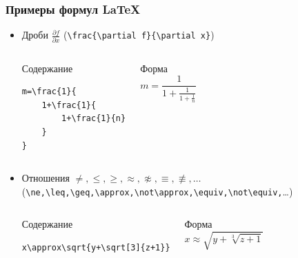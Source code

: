 \begin{frame}[fragile]
\frametitle{Примеры формул \LaTeX}
\begin{itemize}
    
\item Дроби $\frac{\partial f}{\partial x}$ (\verb"\frac{\partial f}{\partial x}")
    \begin{columns}
            \begin{block}{Содержание}
\begin{verbatim}
m=\frac{1}{
    1+\frac{1}{
        1+\frac{1}{n}
    }
}
\end{verbatim}
            \end{block}
        
            \begin{block}{Форма}
\[
m=\frac{1}{1+\frac{1}{1+\frac{1}{n}}}
\]
            \end{block}
    \end{columns}

\item Отношения $\ne,\leq,\geq,\approx,\not\approx,\equiv,\not\equiv,\ldots$ 
(\verb"\ne,\leq,\geq,\approx,\not\approx,\equiv,\not\equiv,"\ldots)
    \begin{columns}
            \begin{block}{Содержание}
\begin{verbatim}
x\approx\sqrt{y+\sqrt[3]{z+1}}
\end{verbatim}
            \end{block}
        
            \begin{block}{Форма}
\[x\approx\sqrt{y+\sqrt[3]{z+1}}\]
            \end{block}
    \end{columns}

\end{itemize}
\end{frame}


